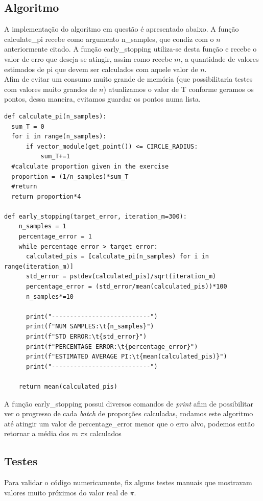 \documentclass[twocolumn,amsmath,amssymb,floatfix]{revtex4}
\begin{document}
\subsection{Algoritmo}
A implementação do algoritmo em questão é apresentado abaixo. A função calculate\_pi recebe como argumento n\_samples, que condiz com o $n$ anteriormente citado. A função early\_stopping utiliza-se desta função e recebe o valor de erro que deseja-se atingir, assim como recebe $m$, a quantidade de valores estimados de pi que devem ser calculados com aquele valor de $n$.
\\\indent Afim de evitar um consumo muito grande de memória (que possibilitaria testes com valores muito grandes de $n$) atualizamos o valor de T conforme geramos os pontos, dessa maneira, evitamos guardar os pontos numa lista.
\begin{lstlisting}
def calculate_pi(n_samples):
  sum_T = 0
  for i in range(n_samples):
      if vector_module(get_point()) <= CIRCLE_RADIUS:
          sum_T+=1
  #calculate proportion given in the exercise
  proportion = (1/n_samples)*sum_T
  #return 
  return proportion*4

def early_stopping(target_error, iteration_m=300):
    n_samples = 1
    percentage_error = 1
    while percentage_error > target_error:
      calculated_pis = [calculate_pi(n_samples) for i in range(iteration_m)]
      std_error = pstdev(calculated_pis)/sqrt(iteration_m)
      percentage_error = (std_error/mean(calculated_pis))*100
      n_samples*=10

      print("---------------------------")
      print(f"NUM SAMPLES:\t{n_samples}")
      print(f"STD ERROR:\t{std_error}")
      print(f"PERCENTAGE ERROR:\t{percentage_error}")
      print(f"ESTIMATED AVERAGE PI:\t{mean(calculated_pis)}")
      print("---------------------------")

    return mean(calculated_pis)
\end{lstlisting}
A função early\_stopping possui diversos comandos de \textit{print} afim de possibilitar ver o progresso de cada \textit{batch} de proporções calculadas, rodamos este algoritmo até atingir um valor de percentage\_error menor que o erro alvo, podemos então retornar a média dos $m$ $\pi$s calculados

\subsection{Testes}
Para validar o código numericamente, fiz alguns testes manuais que mostravam valores muito próximos do valor real de $\pi$.
\end{document}
